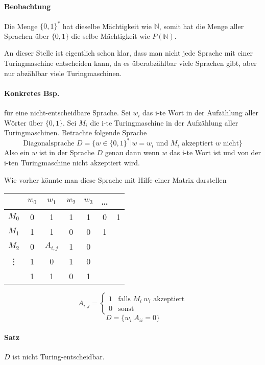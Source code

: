 \paragraph*{Beobachtung} Die Menge $\{0,1\}^*$ hat dieselbe Mächtigkeit wie $\mathbb{N}$, somit hat die Menge aller Sprachen über $\{0,1\}$ die selbe Mächtigkeit wie $P(\mathbb{N})$.

\para{} An dieser Stelle ist eigentlich schon klar, dass man nicht jede Sprache mit einer Turingmaschine entscheiden kann, da es überabzählbar viele Sprachen gibt, aber nur abzählbar viele Turingmaschinen.

\paragraph*{Konkretes Bsp.} für eine nicht-entscheidbare Sprache. Sei $w_i$ das i-te Wort in der Aufzählung aller Wörter über $\{0,1\}$. Sei $M_i$ die i-te Turingmaschine in der Aufzählung aller Turingmaschinen. Betrachte folgende Sprache $$ \text{Diagonalsprache } D=\{ w\in\{0,1\}^*|w=w_i \text{ und } M_i \text{ akzeptiert } w \text{ nicht} \} $$ Also ein $w$ ist in der Sprache $D$ genau dann wenn $w$ das i-te Wort ist und von der i-ten Turingmaschine nicht akzeptiert wird.

\para{} Wie vorher könnte man diese Sprache mit Hilfe einer Matrix darstellen
\begin{table}[htb!]
\centering
\begin{tabular}{c|c c c c c c}
 & $w_0$ & $w_1$ & $w_2$ & $w_3$ & \dots & \\
\hline
$M_0$ & 0 & 1 & 1 & 1 & 0 & 1 \\
$M_1$ & 1 & 1 & 0 & 0 & 1 &  \\
$M_2$ & 0 & $A_{i,j}$ & 1 & 0 &  &  \\
\vdots & 1 & 0 & 1 & 0 &  &  \\
 & 1 & 1 & 0 & 1 &  &  \\
\end{tabular}
\end{table}
$$ A_{i,j} = \begin{cases}1&\text{falls } M_i\ w_i \text{ akzeptiert} \\ 0 & \text{sonst}\end{cases} $$
$$ D=\{ w_i | A_{ii}=0 \}$$

\paragraph*{Satz} $D$ ist nicht Turing-entscheidbar.

